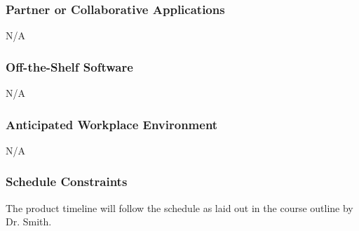 \documentclass[12pt]{article}
\begin{document}
\subsubsection{Partner or Collaborative Applications}
N/A
\subsubsection{Off-the-Shelf Software}
N/A
\subsubsection{Anticipated Workplace Environment}
N/A
\subsubsection{Schedule Constraints}
The product timeline will follow the schedule as laid out in the course outline by Dr. Smith. \\
\newline
\end{document}
